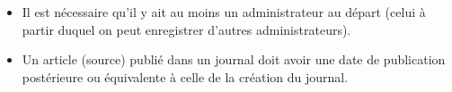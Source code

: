 	\begin{itemize}
	\item Il est nécessaire qu'il y ait au moins un administrateur au départ (celui à partir duquel on peut enregistrer d'autres administrateurs).
	\item Un article (source) publié dans un journal doit avoir une date de publication postérieure ou équivalente à celle de la création du journal.
	\end{itemize}